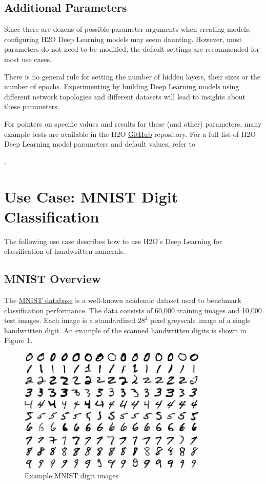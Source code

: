 {\subsection{Additional Parameters} 

Since there are dozens of possible parameter arguments when creating models, configuring H2O Deep Learning models may seem daunting. However, most parameters do not need to be modified; the default settings are recommended for most use cases. 

There is no general rule for setting the number of hidden layers, their sizes or the number of epochs. Experimenting by building Deep Learning models using different network topologies and different datasets will lead to insights about these parameters.

For pointers on specific values and results for these (and other) parameters, many example tests are available in the H2O \href{https://github.com/h2oai/h2o-3/}{GitHub} repository. For a full list of H2O Deep Learning model parameters and default values, refer to {\textbf{}. 


\section{Use Case: MNIST Digit Classification} 
The following use case describes how to use H2O's Deep Learning for classification of handwritten numerals. 

\subsection{MNIST Overview} 

The \href{http://yann.lecun.com/exdb/mnist/}{MNIST database} is a well-known academic dataset used to benchmark classification performance.  The data consists of 60,000 training images and 10,000 test images. Each image is a standardized $28^2$ pixel greyscale image of a single handwritten digit.  An example of the scanned handwritten digits is shown in Figure 1. 

\begin{figure}[ht!]
\centering
\includegraphics[width=90mm]{./images/mnistdigits.jpg}
\caption{Example MNIST digit images \label{overflow}}
\end{figure}

}}
